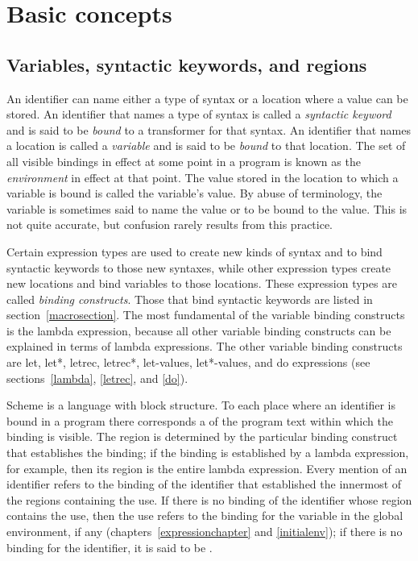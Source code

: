 \chapter{Basic concepts}
\label{basicchapter}

\section{Variables, syntactic keywords, and regions}
\label{specialformsection}
\label{variablesection}

An identifier can name either a type of syntax or
a location where a value can be stored.  An identifier that names a type
of syntax is called a {\em syntactic keyword}
and is said to be {\em bound} to a transformer for that syntax.  An identifier that names a
location is called a {\em variable} and is said to be
{\em bound} to that location.  The set of all visible
bindings in effect at some point in a program is
known as the {\em environment} in effect at that point.  The value
stored in the location to which a variable is bound is called the
variable's value.  By abuse of terminology, the variable is sometimes
said to name the value or to be bound to the value.  This is not quite
accurate, but confusion rarely results from this practice.

\vest Certain expression types are used to create new kinds of syntax
and to bind syntactic keywords to those new syntaxes, while other
expression types create new locations and bind variables to those
locations.  These expression types are called {\em binding constructs}.
Those that bind syntactic keywords are listed in section~\ref{macrosection}.
The most fundamental of the variable binding constructs is the
{\cf lambda} expression, because all other variable binding constructs
can be explained in terms of {\cf lambda} expressions.  The other
variable binding constructs are {\cf let}, {\cf let*}, {\cf letrec},
{\cf letrec*}, {\cf let-values}, {\cf let*-values},
and {\cf do} expressions (see sections~\ref{lambda}, \ref{letrec}, and
\ref{do}).


\vest Scheme is a language with
block structure.  To each place where an identifier is bound in a program
there corresponds a  of the program text within which
the binding is visible.  The region is determined by the particular
binding construct that establishes the binding; if the binding is
established by a {\cf lambda} expression, for example, then its region
is the entire {\cf lambda} expression.  Every mention of an identifier
refers to the binding of the identifier that established the
innermost of the regions containing the use.  If there is no binding of
the identifier whose region contains the use, then the use refers to the
binding for the variable in the global environment, if any
(chapters~\ref{expressionchapter} and \ref{initialenv}); if there is no
binding for the identifier,
it is said to be .

